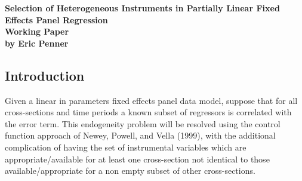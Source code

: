 \documentclass[10pt]{article}
\begin{document}
\doublespacing
\begin{center}
\Large \bf Selection of Heterogeneous Instruments in Partially Linear
Fixed Effects Panel Regression \\
\rm \normalsize Working Paper \\
\large by Eric Penner \rm
\end{center}


\subsection*{Introduction }
\noindent Given a linear in parameters fixed effects panel data model, suppose that for all cross-sections and time periods a known subset of regressors is correlated with the error term. This endogeneity problem will be resolved using the control function approach of Newey, Powell, and Vella (1999), with the additional complication of having the set of instrumental variables which are appropriate/available for at least one cross-section  not identical to those available/appropriate for a non empty subset of other cross-sections. 
\end{document}
